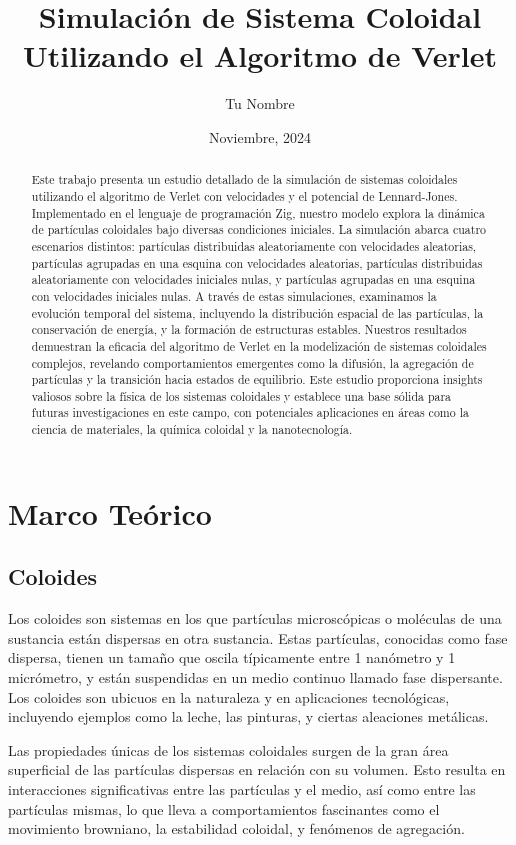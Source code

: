 \documentclass[twocolumn]{article}
\title{Simulación de Sistema Coloidal Utilizando el Algoritmo de Verlet}
\author{Tu Nombre}
\date{Noviembre, 2024}
\begin{document}
\maketitle

\begin{abstract}
Este trabajo presenta un estudio detallado de la simulación de sistemas coloidales utilizando el algoritmo de Verlet con velocidades y el potencial de Lennard-Jones. Implementado en el lenguaje de programación Zig, nuestro modelo explora la dinámica de partículas coloidales bajo diversas condiciones iniciales. La simulación abarca cuatro escenarios distintos: partículas distribuidas aleatoriamente con velocidades aleatorias, partículas agrupadas en una esquina con velocidades aleatorias, partículas distribuidas aleatoriamente con velocidades iniciales nulas, y partículas agrupadas en una esquina con velocidades iniciales nulas. A través de estas simulaciones, examinamos la evolución temporal del sistema, incluyendo la distribución espacial de las partículas, la conservación de energía, y la formación de estructuras estables. Nuestros resultados demuestran la eficacia del algoritmo de Verlet en la modelización de sistemas coloidales complejos, revelando comportamientos emergentes como la difusión, la agregación de partículas y la transición hacia estados de equilibrio. Este estudio proporciona insights valiosos sobre la física de los sistemas coloidales y establece una base sólida para futuras investigaciones en este campo, con potenciales aplicaciones en áreas como la ciencia de materiales, la química coloidal y la nanotecnología.
\end{abstract}

\section{Marco Teórico}
\subsection*{Coloides}
Los coloides son sistemas en los que partículas microscópicas o moléculas de una sustancia están dispersas en otra sustancia. Estas partículas, conocidas como fase dispersa, tienen un tamaño que oscila típicamente entre 1 nanómetro y 1 micrómetro, y están suspendidas en un medio continuo llamado fase dispersante. Los coloides son ubicuos en la naturaleza y en aplicaciones tecnológicas, incluyendo ejemplos como la leche, las pinturas, y ciertas aleaciones metálicas.

Las propiedades únicas de los sistemas coloidales surgen de la gran área superficial de las partículas dispersas en relación con su volumen. Esto resulta en interacciones significativas entre las partículas y el medio, así como entre las partículas mismas, lo que lleva a comportamientos fascinantes como el movimiento browniano, la estabilidad coloidal, y fenómenos de agregación.
\end{document}
